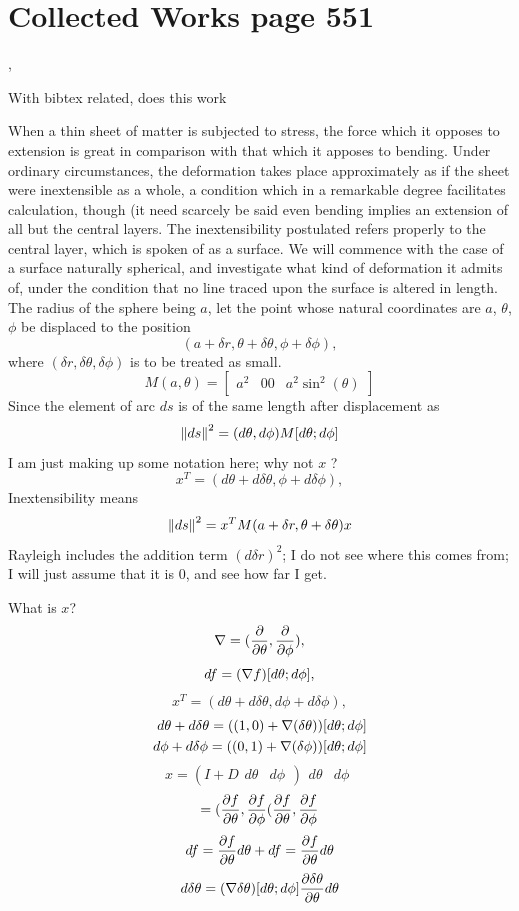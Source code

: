 \section{Collected Works page 551},

With bibtex related,
does this work\cite{Rayleigh1881,ScientificPapersVol1,RayleighSoundVol1Ed2}

When a thin sheet of matter is subjected to stress, the force which it opposes
to extension is great in comparison with that which it apposes to bending.
Under ordinary circumstances, the deformation takes place approximately as if
the sheet were inextensible as a whole, a condition which in a remarkable
degree facilitates calculation, though (it need scarcely be said even bending
implies an extension of all but the central layers.
The inextensibility postulated refers properly to the central layer, which is
spoken of as a surface.
We will commence with the case of a surface naturally spherical, and
investigate what kind of deformation it admits of, under the condition that no
line traced upon the surface is altered in length. The radius of the sphere
being \(a\), let the point whose natural coordinates are \(a\), \(\theta\), \(\phi\)
be displaced to the position
\[ (a + \delta r, \theta + \delta\theta, \phi + \delta \phi),\]
 where \((\delta r,\delta \theta,\delta \phi)\) is to be treated as small.
\[
M(a,\theta) =
\begin{bmatrix}
a^2 & 0
0  & a^2 \sin^2(\theta)
\end{bmatrix}
\]
Since the element of arc \(ds\) is of the same length after displacement as
\[
\left\lVert ds\right\rVert^2 = (d\theta, d \phi) M [d\theta; d \phi ]
\]
I am just making up some notation here;  why not \(x\) ?
\[
x^T = (d\theta + d \delta \theta, \phi + d \delta \phi ),
\]
Inextensibility means
\[
\left\lVert ds\right\rVert^2 = x^T  M(a +  \delta r,\theta + \delta\theta) x
\]
Rayleigh includes the addition term \( (d \delta r)^2 \); I do not see
where this comes from; I will just assume that it is \(0\), and see
how far I get.


What is \(x\)?
\[
\nabla = (\frac{\partial}{\partial \theta}, \frac{\partial}{\partial \phi}),
\]
\[
df = (\nabla f)  [d \theta; d \phi],
\]
\[
x^T = (d\theta + d \delta \theta, d \phi + d \delta \phi ),
\]
\begin{align}
d\theta + d \delta \theta = ((1,0) +\nabla (\delta \theta)) [d \theta; d \phi] \\
d \phi + d \delta \phi  = ((0,1) + \nabla (\delta \phi)) [d \theta; d \phi]
\end{align}
\[
x = \left( I +
D \begin{matrix}
d\theta &
d \phi
\end{matrix} \right)
\begin{matrix}
d\theta &
d \phi
\end{matrix}
\]
\[
= (\frac{\partial f}{\partial \theta}, \frac{\partial f}{\partial \phi}
(\frac{\partial f}{\partial \theta}, \frac{\partial f}{\partial \phi}
\]
\[ d f = \frac{\partial f}{\partial \theta} d \theta  + d f = \frac{\partial f}{\partial \theta} d \theta \]
\[ d \delta \theta =(\nabla \delta \theta )[d \theta;d \phi]
\frac{ \partial \delta \theta }{ \partial \theta } d \theta
\]


